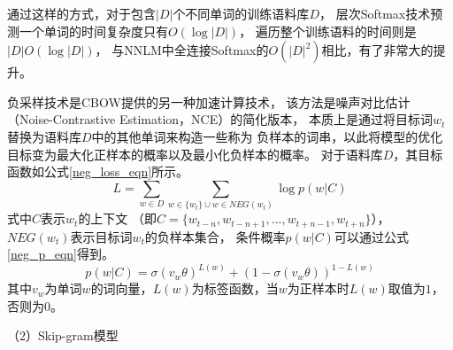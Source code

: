 通过这样的方式，对于包含$|D|$个不同单词的训练语料库$D$，
层次Softmax技术预测一个单词的时间复杂度只有$O\left ( \log|D| \right )$，
遍历整个训练语料的时间则是$|D|O\left ( \log|D| \right )$，
与NNLM中全连接Softmax的$O\left ( |D|^2 \right )$相比，有了非常大的提升。

负采样技术是CBOW提供的另一种加速计算技术，
该方法是噪声对比估计（Noise-Contrastive Estimation，NCE）的简化版本，
本质上是通过将目标词$w_t$替换为语料库$D$中的其他单词来构造一些称为
负样本的词串，以此将模型的优化目标变为最大化正样本的概率以及最小化负样本的概率。
对于语料库$D$，其目标函数如公式\ref{neg_loss_eqn}所示。
\begin{equation}
    L = \sum_{w\in D} \sum_{w\in \{w_t\} \cup w\in NEG\left ( w_t \right )} \log p\left ( w|C \right )
    \label{neg_loss_eqn}
\end{equation}
式中$C$表示$w_t$的上下文
（即$C=\{w_{t-n},w_{t-n+1},...,w_{t+n-1},w_{t+n}\}$），
$NEG(w_t)$表示目标词$w_t$的负样本集合，
条件概率$p\left ( w|C \right )$可以通过公式\ref{neg_p_eqn}得到。
\begin{equation}
    p\left ( w|C \right )=\sigma\left ( v_w\theta  \right )^{L(w)}+\left ( 1- \sigma\left ( v_w\theta  \right )\right )^{1-L\left ( w \right )}
    \label{neg_p_eqn}
\end{equation}
其中$v_w$为单词$w$的词向量，$L(w)$为标签函数，当$w$为正样本时$L(w)$取值为$1$，否则为$0$。

（2）Skip-gram模型

